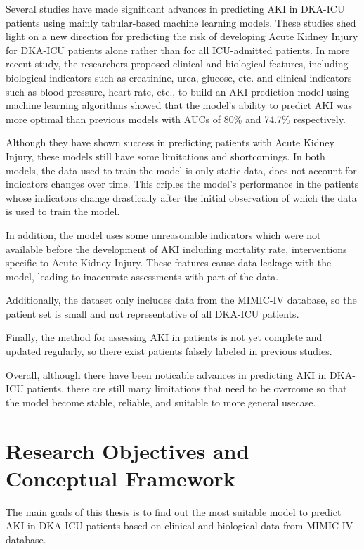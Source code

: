 \documentclass[../main.tex]{subfiles}
\begin{document}
Several studies have made significant advances in predicting AKI in DKA-ICU patients using mainly tabular-based machine learning models.
These studies shed light on a new direction for predicting the risk of developing Acute Kidney Injury for DKA-ICU patients alone rather than for all ICU-admitted patients.
In more recent study, the researchers proposed clinical and biological features, including biological indicators such as creatinine, urea, glucose, etc. and clinical indicators such as blood pressure, heart rate, etc., to build an AKI prediction model using machine learning algorithms showed that the model's ability to predict AKI was more optimal than previous models with AUCs of 80\% and 74.7\% respectively.

Although they have shown success in predicting patients with Acute Kidney Injury, these models still have some limitations and shortcomings.
In both models, the data used to train the model is only static data, does not account for indicators changes over time.
This criples the model's performance in the patients whose indicators change drastically after the initial observation of which the data is used to train the model.

In addition, the model uses some unreasonable indicators which were not available before the development of AKI including mortality rate, interventions specific to Acute Kidney Injury.
These features cause data leakage with the model, leading to inaccurate assessments with part of the data.

Additionally, the dataset only includes data from the MIMIC-IV database, so the patient set is small and not representative of all DKA-ICU patients.

Finally, the method for assessing AKI in patients is not yet complete and updated regularly, so there exist patients falsely labeled in previous studies.

Overall, although there have been noticable advances in predicting AKI in DKA-ICU patients, there are still many limitations that need to be overcome so that the model become stable, reliable, and suitable to more general usecase.



\section{Research Objectives and Conceptual Framework}

The main goals of this thesis is to find out the most suitable model to predict AKI in DKA-ICU patients based on clinical and biological data from MIMIC-IV database.
\end{document}
